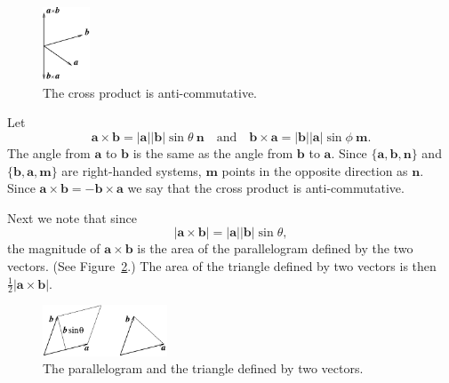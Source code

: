 \begin{figure}[htb!]
\begin{center}
  \includegraphics[width=0.125\textwidth]{algebra/vectors/anticomm}
\end{center}
\caption{The cross product is anti-commutative.}
\label{anticomm}
\end{figure}

Let
\[
\mathbf{a} \times \mathbf{b} = | \mathbf{a} | | \mathbf{b} | \sin \theta\ \mathbf{n}
\quad \mathrm{and} \quad
\mathbf{b} \times \mathbf{a} = | \mathbf{b} | | \mathbf{a} | \sin \phi\ \mathbf{m}.
\]
The angle from $\mathbf{a}$ to $\mathbf{b}$ is the same as the angle from
$\mathbf{b}$ to $\mathbf{a}$.  Since $\{ \mathbf{a}, \mathbf{b}, \mathbf{n} \}$ and 
$\{ \mathbf{b}, \mathbf{a}, \mathbf{m} \}$ are right-handed systems, $\mathbf{m}$
points in the opposite direction as $\mathbf{n}$.  Since 
$\mathbf{a} \times \mathbf{b} = - \mathbf{b} \times \mathbf{a}$ we say that the 
cross product is anti-commutative.



Next we note that since
\[
| \mathbf{a} \times \mathbf{b} | = | \mathbf{a} | | \mathbf{b} | \sin \theta,
\]
the magnitude of $\mathbf{a} \times \mathbf{b}$ is the area of the parallelogram
defined by the two vectors.  (See Figure~\ref{paratri}.)  The area of the 
triangle defined by two vectors is then 
$\frac{1}{2} | \mathbf{a} \times \mathbf{b} |$.

\begin{figure}[htb!]
\begin{center}
  \includegraphics[width=0.33\textwidth]{algebra/vectors/paratri}
\end{center}
\caption{The parallelogram and the triangle defined by two vectors.}
\label{paratri}
\end{figure}



